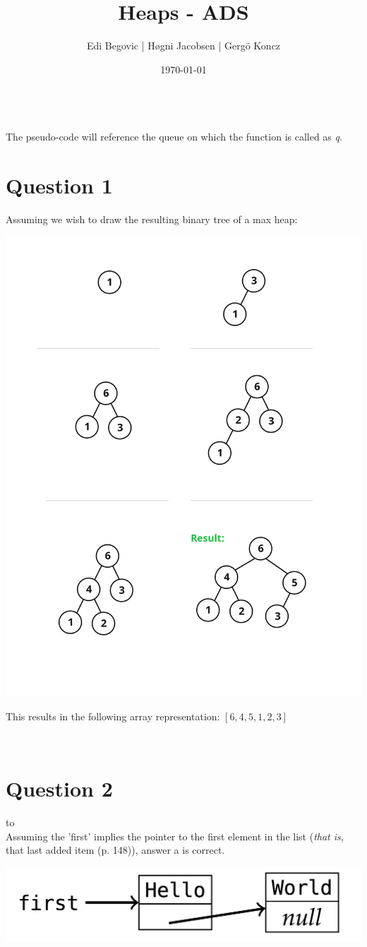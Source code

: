 \documentclass[a4paper]{article}
\title{Heaps - ADS}
\author{Edi Begovic | Høgni Jacobsen | Gergö Koncz}
\date{\today}
\def\headline#1{\hbox to \hsize{\hrulefill\quad\lower.3em\hbox{#1}\quad\hrulefill}}
\begin{document}
 
\maketitle

\ \\
\noindent
The pseudo-code will reference the queue on which the function is called as \textit{q}.
\ \\
\section*{Question 1}
Assuming we wish to draw the resulting binary tree of a max heap:
\ \\
\begin{center}
\includegraphics[scale=0.16]{figure1.png}
\end{center}

\noindent
This results in the following array representation: 
$[6, 4, 5, 1, 2, 3]$


\ \\
\section*{Question 2}
\headline{a} \ \\

\noindent
Assuming the 'first' implies the pointer to the first element in the list 
(\textit{that is}, that last added item (p. 148)), answer a is correct.
\ \\

\begin{center}
\includegraphics[scale=0.22]{figure2.png}
\end{center}
\end{document}
